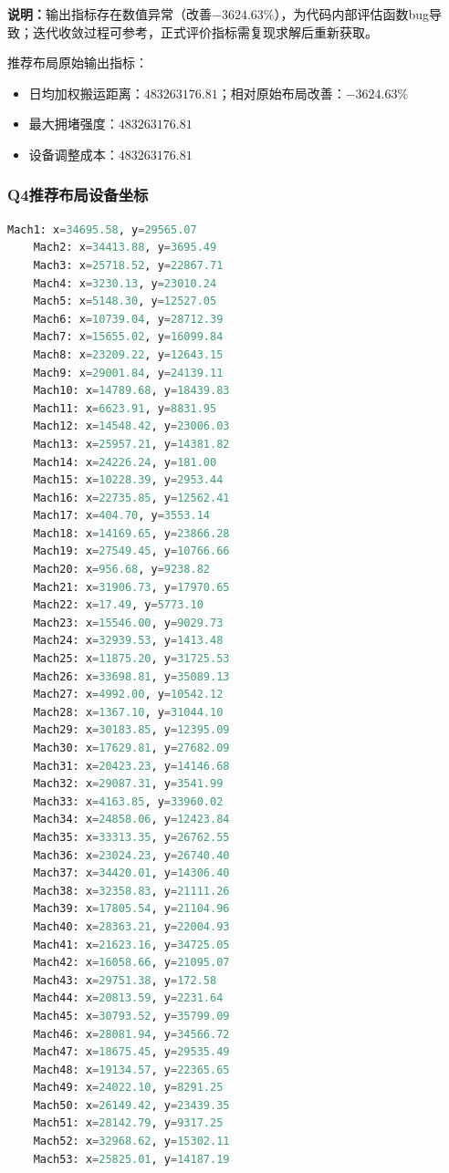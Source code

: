 \documentclass[12pt,a4paper]{article}
\begin{document}
\textbf{说明：}输出指标存在数值异常（改善$-3624.63\%$），为代码内部评估函数bug导致；迭代收敛过程可参考，正式评价指标需复现求解后重新获取。

推荐布局原始输出指标：
\begin{itemize}
	\item 日均加权搬运距离：$483263176.81$；相对原始布局改善：$-3624.63\%$
	\item 最大拥堵强度：$483263176.81$
	\item 设备调整成本：$483263176.81$
\end{itemize}

\subsubsection{Q4推荐布局设备坐标}
\begin{lstlisting}[language=Python,basicstyle=\ttfamily\tiny,breaklines=true,frame=single]
	Mach1: x=34695.58, y=29565.07
	Mach2: x=34413.88, y=3695.49
	Mach3: x=25718.52, y=22867.71
	Mach4: x=3230.13, y=23010.24
	Mach5: x=5148.30, y=12527.05
	Mach6: x=10739.04, y=28712.39
	Mach7: x=15655.02, y=16099.84
	Mach8: x=23209.22, y=12643.15
	Mach9: x=29001.84, y=24139.11
	Mach10: x=14789.68, y=18439.83
	Mach11: x=6623.91, y=8831.95
	Mach12: x=14548.42, y=23006.03
	Mach13: x=25957.21, y=14381.82
	Mach14: x=24226.24, y=181.00
	Mach15: x=10228.39, y=2953.44
	Mach16: x=22735.85, y=12562.41
	Mach17: x=404.70, y=3553.14
	Mach18: x=14169.65, y=23866.28
	Mach19: x=27549.45, y=10766.66
	Mach20: x=956.68, y=9238.82
	Mach21: x=31906.73, y=17970.65
	Mach22: x=17.49, y=5773.10
	Mach23: x=15546.00, y=9029.73
	Mach24: x=32939.53, y=1413.48
	Mach25: x=11875.20, y=31725.53
	Mach26: x=33698.81, y=35089.13
	Mach27: x=4992.00, y=10542.12
	Mach28: x=1367.10, y=31044.10
	Mach29: x=30183.85, y=12395.09
	Mach30: x=17629.81, y=27682.09
	Mach31: x=20423.23, y=14146.68
	Mach32: x=29087.31, y=3541.99
	Mach33: x=4163.85, y=33960.02
	Mach34: x=24858.06, y=12423.84
	Mach35: x=33313.35, y=26762.55
	Mach36: x=23024.23, y=26740.40
	Mach37: x=34420.01, y=14306.40
	Mach38: x=32358.83, y=21111.26
	Mach39: x=17805.54, y=21104.96
	Mach40: x=28363.21, y=22004.93
	Mach41: x=21623.16, y=34725.05
	Mach42: x=16058.66, y=21095.07
	Mach43: x=29751.38, y=172.58
	Mach44: x=20813.59, y=2231.64
	Mach45: x=30793.52, y=35799.09
	Mach46: x=28081.94, y=34566.72
	Mach47: x=18675.45, y=29535.49
	Mach48: x=19134.57, y=22365.65
	Mach49: x=24022.10, y=8291.25
	Mach50: x=26149.42, y=23439.35
	Mach51: x=28142.79, y=9317.25
	Mach52: x=32968.62, y=15302.11
	Mach53: x=25825.01, y=14187.19

\end{lstlisting}
\end{document}
